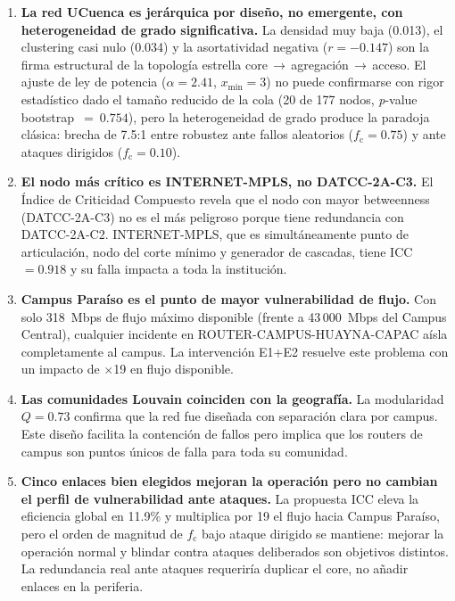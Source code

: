 \documentclass[11pt, a4paper]{article}
\newcommand{\fc}{f_{\mathrm{c}}}
\begin{document}
\begin{enumerate}
    \item \textbf{La red UCuenca es jerárquica por diseño, no emergente, con
    heterogeneidad de grado significativa.} La densidad muy baja (0.013),
    el clustering casi nulo (0.034) y la asortatividad negativa ($r=-0.147$)
    son la firma estructural de la topología estrella core\,$\to$\,agregación\,$\to$\,acceso.
    El ajuste de ley de potencia ($\alpha=2.41$, $x_{\min}=3$) no puede
    confirmarse con rigor estadístico dado el tamaño reducido de la cola (20
    de 177 nodos, \textit{p}-value bootstrap~$=~0.754$), pero la heterogeneidad
    de grado produce la paradoja clásica: brecha de 7.5:1 entre robustez ante
    fallos aleatorios ($\fc = 0.75$) y ante ataques dirigidos ($\fc = 0.10$).

    \item \textbf{El nodo más crítico es INTERNET-MPLS, no DATCC-2A-C3.}
    El Índice de Criticidad Compuesto revela que el nodo con mayor betweenness
    (DATCC-2A-C3) no es el más peligroso porque tiene redundancia con
    DATCC-2A-C2. INTERNET-MPLS, que es simultáneamente punto de articulación,
    nodo del corte mínimo y generador de cascadas, tiene ICC~$= 0.918$ y su
    falla impacta a toda la institución.

    \item \textbf{Campus Paraíso es el punto de mayor vulnerabilidad de flujo.}
    Con solo 318~Mbps de flujo máximo disponible (frente a 43\,000~Mbps del
    Campus Central), cualquier incidente en ROUTER-CAMPUS-HUAYNA-CAPAC aísla
    completamente al campus. La intervención E1+E2 resuelve este problema
    con un impacto de $\times$19 en flujo disponible.

    \item \textbf{Las comunidades Louvain coinciden con la geografía.}
    La modularidad $Q = 0.73$ confirma que la red fue diseñada con
    separación clara por campus. Este diseño facilita la contención de fallos
    pero implica que los routers de campus son puntos únicos de falla para
    toda su comunidad.

    \item \textbf{Cinco enlaces bien elegidos mejoran la operación pero no
    cambian el perfil de vulnerabilidad ante ataques.} La propuesta ICC
    eleva la eficiencia global en 11.9\% y multiplica por 19 el flujo hacia
    Campus Paraíso, pero el orden de magnitud de $\fc$ bajo ataque dirigido
    se mantiene: mejorar la operación normal y blindar contra ataques
    deliberados son objetivos distintos. La redundancia real ante ataques
    requeriría duplicar el core, no añadir enlaces en la periferia.
\end{enumerate}
\end{document}
